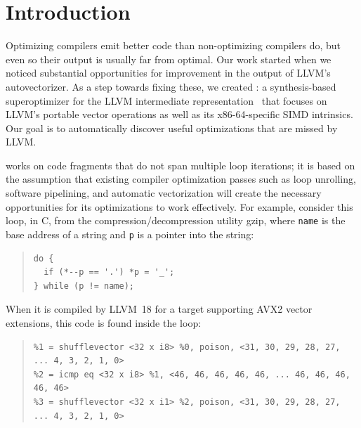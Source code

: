 \section{Introduction}

Optimizing compilers emit better code than non-optimizing compilers
do, but even so their output is usually far from optimal.
%
Our work started when we noticed substantial opportunities for
improvement in the output of LLVM's autovectorizer.
%
As a step towards fixing these, we created \minotaur{}: a synthesis-based
superoptimizer for the LLVM intermediate
representation~\cite{llvm} that focuses on LLVM's portable
vector operations as well as its x86-64-specific SIMD intrinsics.
%
Our goal is to automatically discover useful optimizations that are
missed by LLVM\@.


\minotaur{} works on code fragments that do not span multiple loop
iterations; it is based on the assumption that existing compiler
optimization passes such as loop unrolling, software pipelining, and
automatic vectorization will create the necessary opportunities for
its optimizations to work effectively.
%
For example, consider this loop, in C, from the
compression/decompression utility gzip, where \texttt{name} is the
base address of a string and \texttt{p} is a pointer into the string:

{\begin{quote}
\begin{verbatim}
do {
  if (*--p == '.') *p = '_';
} while (p != name);
\end{verbatim}
\end{quote}}

When it is compiled by LLVM~18 for a target supporting AVX2
vector extensions, this code is found inside the loop:

{\begin{quote}
\begin{verbatim}
%1 = shufflevector <32 x i8> %0, poison, <31, 30, 29, 28, 27, ... 4, 3, 2, 1, 0>
%2 = icmp eq <32 x i8> %1, <46, 46, 46, 46, 46, ... 46, 46, 46, 46, 46>
%3 = shufflevector <32 x i1> %2, poison, <31, 30, 29, 28, 27, ... 4, 3, 2, 1, 0>
\end{verbatim}
\end{quote}}

